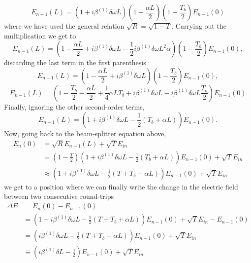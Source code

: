 \begin{equation}
    E_{n-1}(L)=(1+i\beta^{(1)}\delta\omega L)\left(1-\frac{\alpha L}{2}\right)\left(1-\frac{T_b}{2}\right)E_{n-1}(0)
\end{equation}
where we have used the general relation $\sqrt{R}=\sqrt{1-T}$. Carrying out the multiplication we get to
\begin{equation*}
    E_{n-1}(L)=\left(1-\frac{\alpha L}{2}+i\beta^{(1)}\delta\omega L - \frac{1}{2}i\beta^{(1)}\delta\omega L^2\alpha\right)\left(1-\frac{T_b}{2}\right)E_{n-1}(0),
\end{equation*}
discarding the last term in the first parenthesis
\begin{equation*}
    E_{n-1}(L)=\left(1-\frac{\alpha L}{2}+i\beta^{(1)}\delta\omega L\right)\left(1-\frac{T_b}{2}\right)E_{n-1}(0),
\end{equation*}
\begin{equation*}
    E_{n-1}(L)=\left(1-\frac{T_b}{2}-\frac{\alpha L}{2}+\frac{1}{4}\alpha L T_b+i\beta^{(1)}\delta\omega L-i\beta^{(1)}\delta\omega L\frac{T_b}{2}\right)E_{n-1}(0)
\end{equation*}
Finally, ignoring the other second-order terms,
\begin{equation}
    E_{n-1}(L)=\left(1+i\beta^{(1)}\delta\omega L - \frac{1}{2}(T_b+\alpha L)\right)E_{n-1}(0).
\end{equation}
Now, going back to the beam-splitter equation above,
\begin{equation}
    \begin{aligned}
        E_n(0)&=\sqrt{R}E_{n-1}(L)+\sqrt{T}E_{in}\\
        &=\left(1-\frac{T}{2}\right)\left(1+i\beta^{(1)}\delta\omega L - \frac{1}{2}(T_b+\alpha L)\right)E_{n-1}(0)+\sqrt{T}E_{in}\\
        &\approx\left(1+i\beta^{(1)}\delta\omega L - \frac{1}{2}(T+T_b+\alpha L)\right)E_{n-1}(0)+\sqrt{T}E_{in}
    \end{aligned}    
\end{equation}
we get to a position where we can finally write the change in the electric field between two consecutive round-trips
\begin{equation}
    \begin{aligned}
        \Delta E&=E_n(0)-E_{n-1}(0)\\
        &=\left(1+i\beta^{(1)}\delta\omega L - \frac{1}{2}(T+T_b+\alpha L)\right)E_{n-1}(0)+\sqrt{T}E_{in}-E_{n-1}(0)\\
        &=\left(i\beta^{(1)}\delta\omega L - \frac{1}{2}(T+T_b+\alpha L)\right)E_{n-1}(0)+\sqrt{T}E_{in}\\
        &\equiv \left(i\beta^{(1)}\delta L-\frac{\gamma}{2}\right)E_{n-1}(0)+\sqrt{T}E_{in}
    \end{aligned}    
\end{equation}
